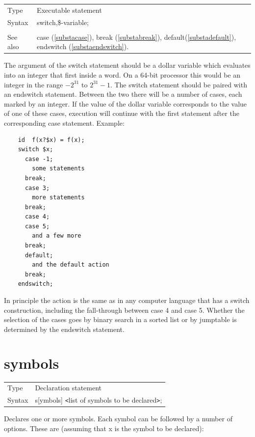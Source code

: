 \noindent \begin{tabular}{ll}
Type & Executable statement\\
Syntax & switch,\$-variable; \\
\\ See also & case (\ref{substacase}), break (\ref{substabreak}),
		 default(\ref{substadefault}), endswitch (\ref{substaendswitch}).
\end{tabular} \vspace{4mm}

\noindent The argument of the switch statement should be a dollar variable 
which evaluates into an integer that first inside a {\FORM} word.
On a 64-bit processor this would be an integer in the range $-2^{31}$ to 
$2^{31}-1$. The switch statement should be paired with an endswitch 
statement. Between the two there will be a number of cases, each marked by 
an integer. If the value of the dollar variable corresponds to the value of 
one of these cases, execution will continue with the first statement after 
the corresponding case statement. Example:
\begin{verbatim}
    id  f(x?$x) = f(x);
    switch $x;
      case -1;
        some statements
      break;
      case 3;
        more statements
      break;
      case 4;
      case 5;
        and a few more
      break;
      default;
        and the default action
      break;
    endswitch;
\end{verbatim}
In principle the action is the same as in any computer language that has a 
switch construction, including the fall-through between case 4 and case 5. 
Whether the selection of the cases goes by binary search in a sorted list 
or by jumptable is determined by the endswitch statement.


\vspace{10mm}
%
 
\section{symbols}
\label{substasymbols}

\noindent \begin{tabular}{ll}
Type & Declaration statement\\
Syntax & s[ymbols] {\tt<}list of symbols to be declared{\tt>};
\end{tabular}\vspace{4mm}

\noindent Declares one or more symbols. Each symbol can be 
followed by a number of options. These are (assuming that x is the symbol 
to be declared):

